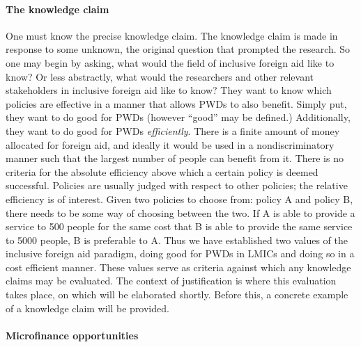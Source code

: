 \documentclass[a4paper]{article}
\begin{document}
\paragraph{The knowledge claim}

One must know the precise knowledge claim. The knowledge claim is made in
response to some unknown, the original question that prompted the research. So
one may begin by asking, what would the field of inclusive foreign aid like to
know? Or less abstractly, what would the researchers and other relevant
stakeholders in inclusive foreign aid like to know? They want to know which
policies are effective in a manner that allows PWDs to also benefit. Simply
put, they want to do good for PWDs (however ``good'' may be defined.)
Additionally, they want to do good for PWDs \emph{efficiently}. There is a
finite amount of money allocated for foreign aid, and ideally it would be used
in a nondiscriminatory manner such that the largest number of people can
benefit from it. There is no criteria for the absolute efficiency above which
a certain policy is deemed successful. Policies are usually judged with
respect to other policies; the relative efficiency is of interest. Given two
policies to choose from: policy A and policy B, there needs to be some way of
choosing between the two. If A is able to provide a service to 500 people for
the same cost that B is able to provide the same service to 5000 people, B is
preferable to A. Thus we have established two values of the inclusive foreign
aid paradigm, doing good for PWDs in LMICs and doing so in a cost efficient
manner. These values serve as criteria against which any knowledge claims may
be evaluated. The context of justification is where this evaluation takes
place, on which will be elaborated shortly. Before this, a concrete example of
a knowledge claim will be provided.

\paragraph{Microfinance opportunities}

\end{document}

